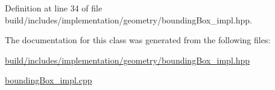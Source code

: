 Definition at line 34 of file build/includes/implementation/geometry/bounding\+Box\+\_\+impl.\+hpp.



The documentation for this class was generated from the following files\+:\begin{DoxyCompactItemize}
\item 
\hyperlink{build_2includes_2implementation_2geometry_2boundingBox__impl_8hpp}{build/includes/implementation/geometry/bounding\+Box\+\_\+impl.\+hpp}\item 
\hyperlink{boundingBox__impl_8cpp}{bounding\+Box\+\_\+impl.\+cpp}\end{DoxyCompactItemize}
